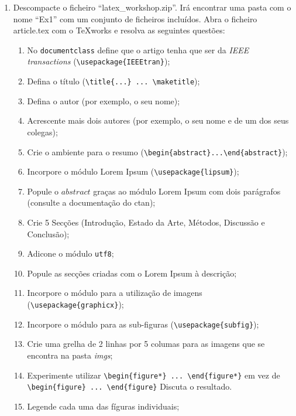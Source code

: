 \begin{enumerate}
\item Descompacte o ficheiro ``latex\_workshop.zip''. Irá encontrar uma pasta com o nome ``Ex1'' com um conjunto de ficheiros incluídos. Abra o ficheiro article.tex com o TeXworks e resolva as seguintes questões:
\begin{enumerate}
  \item\label{one:one} No \verb!documentclass! define que o artigo tenha que ser da \emph{IEEE transactions} (\verb!\usepackage{IEEEtran}!);
  \item Defina o título (\verb!\title{...} ... \maketitle!);
  \item Defina o autor (por exemplo, o seu nome);
  \item Acrescente mais dois autores (por exemplo, o seu nome e de um dos seus colegas);
  \item\label{one:five} Crie o ambiente para o resumo (\verb!\begin{abstract}...\end{abstract}!);
  \item Incorpore o módulo Lorem Ipsum (\verb!\usepackage{lipsum}!);
  \item Popule o $abstract$ graças ao módulo Lorem Ipsum com dois parágrafos (consulte a documentação do ctan);
  \item Crie 5 Secções (Introdução, Estado da Arte, Métodos, Discussão e Conclusão);
  \item Adicone o módulo \verb!utf8!;
  \item Popule as secções criadas com o Lorem Ipsum à descrição;
  \item Incorpore o módulo para a utilização de imagens (\verb!\usepackage{graphicx}!);
  \item Incorpore o módulo para as sub-figuras (\verb!\usepackage{subfig}!);
  \item Crie uma grelha de 2 linhas por 5 columas para as imagens que se encontra na pasta \emph{imgs};
  \item Experimente utilizar \verb!\begin{figure*} ... \end{figure*}! em vez de \verb!\begin{figure} ... \end{figure}! Discuta o resultado.
  \item Legende cada uma das fíguras individuais;

\end{enumerate}
\end{enumerate}
